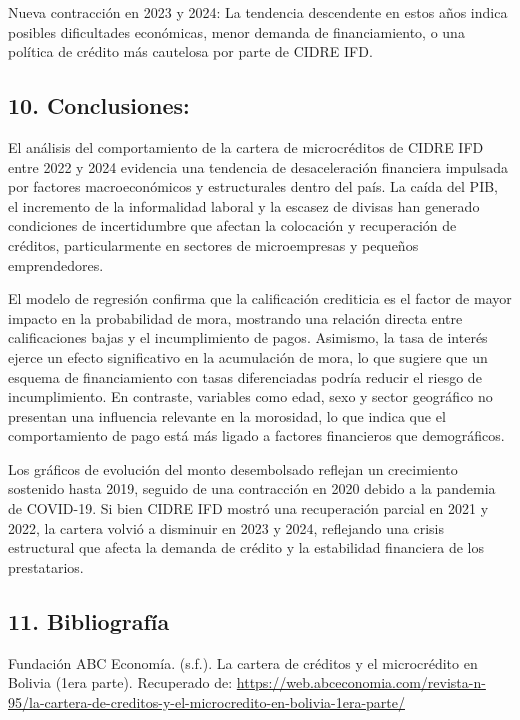 \documentclass[Royal,times,sageh]{sagej}
\begin{document}
Nueva contracción en 2023 y 2024: La tendencia descendente en estos años
indica posibles dificultades económicas, menor demanda de
financiamiento, o una política de crédito más cautelosa por parte de
CIDRE IFD.

\subsection{\texorpdfstring{10.
\textbf{Conclusiones:}}{10. Conclusiones:}}\label{conclusiones}

El análisis del comportamiento de la cartera de microcréditos de CIDRE
IFD entre 2022 y 2024 evidencia una tendencia de desaceleración
financiera impulsada por factores macroeconómicos y estructurales dentro
del país. La caída del PIB, el incremento de la informalidad laboral y
la escasez de divisas han generado condiciones de incertidumbre que
afectan la colocación y recuperación de créditos, particularmente en
sectores de microempresas y pequeños emprendedores.

El modelo de regresión confirma que la calificación crediticia es el
factor de mayor impacto en la probabilidad de mora, mostrando una
relación directa entre calificaciones bajas y el incumplimiento de
pagos. Asimismo, la tasa de interés ejerce un efecto significativo en la
acumulación de mora, lo que sugiere que un esquema de financiamiento con
tasas diferenciadas podría reducir el riesgo de incumplimiento. En
contraste, variables como edad, sexo y sector geográfico no presentan
una influencia relevante en la morosidad, lo que indica que el
comportamiento de pago está más ligado a factores financieros que
demográficos.

Los gráficos de evolución del monto desembolsado reflejan un crecimiento
sostenido hasta 2019, seguido de una contracción en 2020 debido a la
pandemia de COVID-19. Si bien CIDRE IFD mostró una recuperación parcial
en 2021 y 2022, la cartera volvió a disminuir en 2023 y 2024, reflejando
una crisis estructural que afecta la demanda de crédito y la estabilidad
financiera de los prestatarios.

\subsection{11. Bibliografía}\label{bibliografuxeda}

Fundación ABC Economía. (s.f.). La cartera de créditos y el microcrédito
en Bolivia (1era parte). Recuperado de:
\url{https://web.abceconomia.com/revista-n-95/la-cartera-de-creditos-y-el-microcredito-en-bolivia-1era-parte/}
\end{document}
